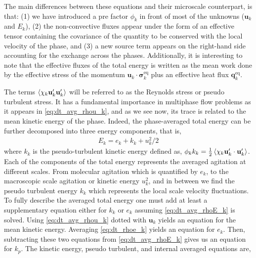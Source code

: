 The main differences between these equations and their microscale counterpart, is that: 
(1) we have introduced a pre factor $\phi_k$ in front of most of the unknowns  ($\textbf{u}_k$ and $E_k$), 
(2) the non-convective fluxes appear under the form of an effective tensor containing the covariance of the quantity to be conserved with the local velocity of the phase, 
and (3) a new source term appears on the right-hand side accounting for the exchange across the phases. 
Additionally, it is interesting to note that the effective fluxes of the total energy is written as the mean work done by the effective stress of the momentum $\textbf{u}_k \cdot \bm{\sigma}_k^\text{eq}$ plus an effective heat flux $\bm{q}_k^\text{eq}$. 

The terms $\left<\chi_k \textbf{u}_k'\textbf{u}_k'\right>$ will be referred to as the Reynolds stress or pseudo turbulent stress. 
It has a fundamental importance in multiphase flow problems as it appears in \ref{eq:dt_avg_rhou_k}, and as we see now, its trace is related to the mean kinetic energy of the phase. 
Indeed, the phase-averaged total energy can be further decomposed into three energy components, that is,  
\begin{align}
    E_k = e_k + k_k + u_k^2/2
    \label{eq:E_def2}
\end{align}
where $k_k$ is the pseudo-turbulent kinetic energy defined as, $\phi_k k_k = \frac{1}{2}\left<\chi_k \textbf{u}_k'\cdot \textbf{u}_k'\right>$. 
Each of the components of the total energy represents the averaged agitation at different scales. 
From molecular agitation which is quantified by $e_k$, to the macroscopic scale agitation or kinetic energy $u_k^2$, and in between we find the pseudo turbulent energy $k_k$ which represents the local scale velocity fluctuations. 
To fully describe the averaged total energy one must add at least a supplementary equation either for $k_k$ or $e_k$ assuming \ref{eq:dt_avg_rhoE_k} is solved. 
Using \ref{eq:dt_avg_rhou_k} dotted with $\textbf{u}_k$ yields an equation for the mean kinetic energy. 
Averaging \ref{eq:dt_rhoe_k} yields an equation for $e_k$.  
Then, subtracting these two equations from \ref{eq:dt_avg_rhoE_k} gives us an equation for $k_p$. 
The kinetic energy, pseudo turbulent, and internal averaged equations are, 
